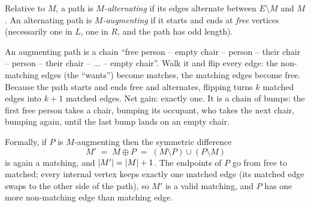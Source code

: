 \begin{definition}
\label{ch15:def-aug}
Relative to $M$, a path is \emph{$M$-alternating} if its edges alternate between
$E\setminus M$ and $M$. An alternating path is \emph{$M$-augmenting} if it starts
and ends at \emph{free} vertices (necessarily one in $L$, one in $R$, and the
path has odd length).
\end{definition}

\begin{intuitionbox}
An augmenting path is a chain ``free person -- empty chair -- person -- their chair
-- person -- their chair -- $\dots$ -- empty chair''. Walk it and flip every edge:
the non-matching edges (the ``wants'') become matches, the matching edges become
free. Because the path starts and ends free and alternates, flipping turns $k$
matched edges into $k+1$ matched edges. Net gain: exactly one. It is a chain of
bumps: the first free person takes a chair, bumping its occupant, who takes the
next chair, bumping again, until the last bump lands on an empty chair.
\end{intuitionbox}

Formally, if $P$ is $M$-augmenting then the symmetric difference
\[
M' \;=\; M \oplus P \;=\; (M\setminus P)\cup(P\setminus M)
\]
is again a matching, and $\lvert M'\rvert=\lvert M\rvert+1$. The endpoints of $P$ go from free
to matched; every internal vertex keeps exactly one matched edge (its matched
edge swaps to the other side of the path), so $M'$ is a valid matching, and $P$
has one more non-matching edge than matching edge.


